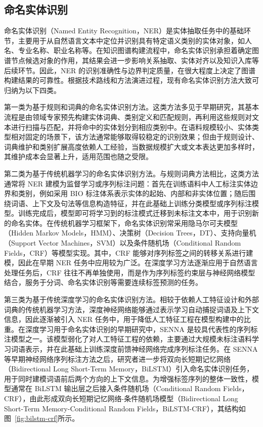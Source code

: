 \subsection{命名实体识别}

命名实体识别（Named Entity Recognition，NER）是实体抽取任务中的基础环节，主要用于从自然语言文本中定位并识别具有特定语义类别的实体对象，如人名、专业名称、职业名称等。在知识图谱构建流程中，命名实体识别承担着确定图谱节点候选对象的作用，其结果会进一步影响关系抽取、实体对齐以及知识入库等后续环节。因此，NER 的识别准确性与边界判定质量，在很大程度上决定了图谱构建结果的可靠性。根据技术路线和方法演进过程，现有命名实体识别方法大致可归纳为以下四类。

第一类为基于规则和词典的命名实体识别方法。这类方法多见于早期研究，其基本流程是由领域专家预先构建实体词典、类别定义和匹配规则，再利用这些规则对文本进行扫描与匹配，并将命中的实体划分到相应类别中。在语料规模较小、实体类型相对固定的场景下，该方法通常能够取得较稳定的识别效果；但由于规则设计、词典维护和类别扩展高度依赖人工经验，当数据规模扩大或文本表达更加多样时，其维护成本会显著上升，适用范围也随之受限。

第二类为基于传统机器学习的命名实体识别方法。与规则词典方法相比，这类方法通常将 NER 建模为监督学习或序列标注问题：首先在训练语料中人工标注实体边界和类别，例如采用 BIO 标注体系表示实体的起始、内部和非实体位置；随后围绕词语、上下文及句法等信息构造特征，并在此基础上训练分类模型或序列标注模型。训练完成后，模型即可将学习到的标注模式迁移到未标注文本中，用于识别新的命名实体。在传统机器学习框架下，命名实体识别常采用隐马尔可夫模型（Hidden Markov Models，HMM）、决策树（Decision Trees，DT）、支持向量机（Support Vector Machines，SVM）以及条件随机场（Conditional Random Fields，CRF）等模型实现\cite{Rabiner1989HMMTutorial,Quinlan1986DecisionTrees,Chen2005NuSVM,Sutton2012CRFTutorial}。其中，CRF 能够对序列标签之间的转移关系进行建模，因此在早期 NER 任务中应用较为广泛。在深度学习方法逐渐应用于自然语言处理任务后，CRF 往往不再单独使用，而是作为序列标签约束层与神经网络模型结合，服务于分词、命名实体识别等需要连续标签预测的任务。

第三类为基于传统深度学习的命名实体识别方法。相较于依赖人工特征设计和外部词典的传统机器学习方法，深度神经网络能够通过表示学习自动捕捉词语及上下文信息，因此逐渐被引入 NER 任务中，用于降低人工特征工程在模型构建中的比重。在深度学习用于命名实体识别的早期研究中，SENNA 是较具代表性的序列标注模型之一。该模型弱化了对人工特征工程的依赖，主要通过大规模未标注语料学习词语表示，并在此基础上训练深度前馈神经网络完成序列标注任务\cite{Collobert2011NLPFromScratch}。在 SENNA 等早期神经网络序列标注方法之后，研究者进一步将双向长短期记忆网络（Bidirectional Long Short-Term Memory，BiLSTM）引入命名实体识别任务，用于同时建模词语前后两个方向的上下文信息。为增强标签序列的整体一致性，模型通常在 BiLSTM 输出层之后接入条件随机场（Conditional Random Fields，CRF），由此形成双向长短期记忆网络-条件随机场模型（Bidirectional Long Short-Term Memory-Conditional Random Fields，BiLSTM-CRF）\cite{Lample2016NeuralArchitecturesNER}，其结构如图~\ref{fig:bilstm-crf}所示。

